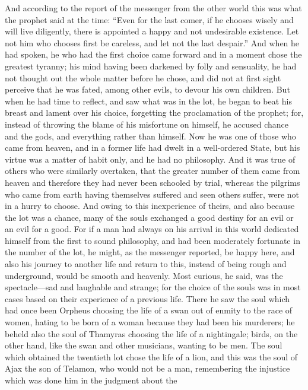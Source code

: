 \documentclass[12pt]{article}
\begin{document}
And according to the report of the messenger from the other world this was what
the prophet said at the time: ``Even for the last comer, if he chooses wisely
and will live diligently, there is appointed a happy and not undesirable
existence. Let not him who chooses first be careless, and let not the last
despair.'' And when he had spoken, he who had the first choice came forward and
in a moment chose the greatest tyranny; his mind having been darkened by folly
and sensuality, he had not thought out the whole matter before he chose, and
did not at first sight perceive that he was fated, among other evils, to devour
his own children. But when he had time to reflect, and saw what was in the lot,
he began to beat his breast and lament over his choice, forgetting the
proclamation of the prophet; for, instead of throwing the blame of his
misfortune on himself, he accused chance and the gods, and everything rather
than himself. Now he was one of those who came from heaven, and in a former
life had dwelt in a well-ordered State, but his virtue was a matter of habit
only, and he had no philosophy. And it was true of others who were similarly
overtaken, that the greater number of them came from heaven and therefore they
had never been schooled by trial, whereas the pilgrims who came from earth
having themselves suffered and seen others suffer, were not in a hurry to
choose. And owing to this inexperience of theirs, and also because the lot was
a chance, many of the souls exchanged a good destiny for an evil or an evil for
a good. For if a man had always on his arrival in this world dedicated himself
from the first to sound philosophy, and had been moderately fortunate in the
number of the lot, he might, as the messenger reported, be happy here, and also
his journey to another life and return to this, instead of being rough and
underground, would be smooth and heavenly. Most curious, he said, was the
spectacle---sad and laughable and strange; for the choice of the souls was in
most cases based on their experience of a previous life. There he saw the soul
which had once been Orpheus choosing the life of a swan out of enmity to the
race of women, hating to be born of a woman because they had been his
murderers; he beheld also the soul of Thamyras choosing the life of a
nightingale; birds, on the other hand, like the swan and other musicians,
wanting to be men. The soul which obtained the twentieth lot chose the life of
a lion, and this was the soul of Ajax the son of Telamon, who would not be a
man, remembering the injustice which was done him in the judgment about the
\end{document}
